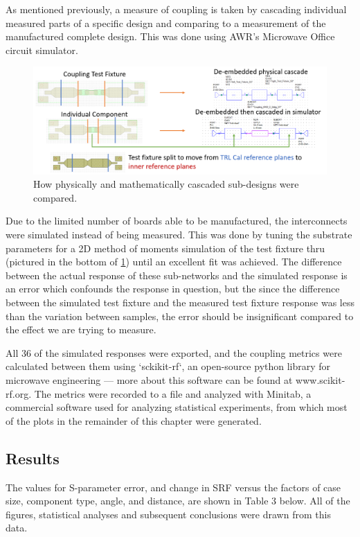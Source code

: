 \documentclass[12pt]{usfcoe}
\begin{document}
    As mentioned previously, a measure of coupling is taken by cascading individual measured parts of a specific design and comparing to a measurement of the manufactured complete design. This was done using AWR's Microwave Office circuit simulator. 
    
    \begin{figure}[H]
		\begin{center}
        	\includegraphics[width=\textwidth]{images/ANOVA/cascasde_vs_physical_explanation.png} 
			\caption{How physically and mathematically cascaded sub-designs were compared.} 
			\label{fig:cascading}
		\end{center}
	\end{figure}    
	
	Due to the limited number of boards able to be manufactured, the interconnects were simulated instead of being measured. 
	This was done by tuning the substrate parameters for a 2D method of moments simulation of the test fixture thru (pictured in the bottom of \ref{fig:cascading}) until an excellent fit was achieved. 
    The difference between the actual response of these sub-networks and the simulated response is an error which confounds the response in question, but the since the difference between the simulated test fixture and the measured test fixture response was less than the variation between samples, the error should be insignificant compared to the effect we are trying to measure.
    
    All 36 of the simulated responses were exported, and the coupling metrics were calculated between them using `sckikit-rf`, an open-source python library for microwave engineering --- more about this software can be found at www.scikit-rf.org.
	The metrics were recorded to a file and analyzed with Minitab, a commercial software used for analyzing statistical experiments, from which most of the plots in the remainder of this chapter were generated.
	
    \subsection{Results}
    The values for S-parameter error, and change in SRF versus the factors of case size, component type, angle, and distance, are shown in Table 3 below.
    All of the figures, statistical analyses and subsequent conclusions were drawn from this data.
\end{document}
